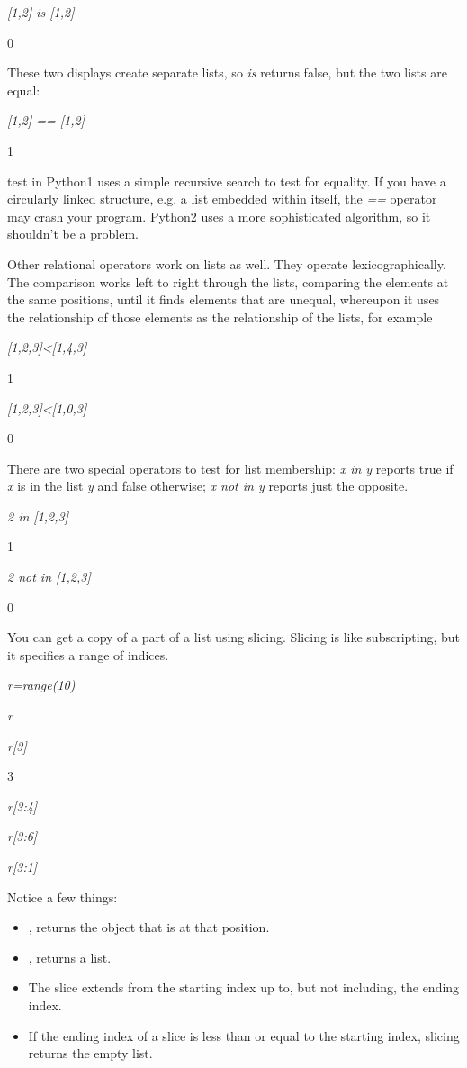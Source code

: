 \emph{{[}1,2{]} is {[}1,2{]}}

0

These two displays create separate
lists, so \emph{is} returns false, but the two lists are equal:


\emph{{[}1,2{]} == {[}1,2{]}}

1

 test in
Python1 uses a simple recursive search to test for equality. If you have
a circularly linked structure, e.g. a list embedded within itself, the
\emph{==} operator may crash your program. Python2 uses a more
sophisticated algorithm, so it shouldn't be a problem.

Other relational operators work on
lists as well. They operate lexicographically. The comparison works left
to right through the lists, comparing the elements at the same
positions, until it finds elements that are unequal, whereupon it uses
the relationship of those elements as the relationship of the lists, for
example


\emph{{[}1,2,3{]}\textless{}{[}1,4,3{]}}

1


\emph{{[}1,2,3{]}\textless{}{[}1,0,3{]}}

0

There are two special operators to
test for list membership: \emph{x in y} reports true if \emph{x} is in
the list \emph{y} and false otherwise; \emph{x not in y} reports just
the opposite.


\emph{2 in {[}1,2,3{]}}

1


\emph{2 not in {[}1,2,3{]}}

0

You can get a copy of a part of a
list using slicing. Slicing is like subscripting, but it specifies a
range of indices.


\emph{r=range(10)}


\emph{r}




\emph{r{[}3{]}}

3


\emph{r{[}3:4{]}}




\emph{r{[}3:6{]}}




\emph{r{[}3:1{]}}



Notice a few things:

\begin{itemize}

\item
   ,
  returns the object that is at that position.
\item
  ,
  returns a list.
\item
  The slice extends from the
  starting index up to, but not including, the ending index.
\item
  If the ending index of a slice is
  less than or equal to the starting index, slicing returns the empty
  list.
\end{itemize}

